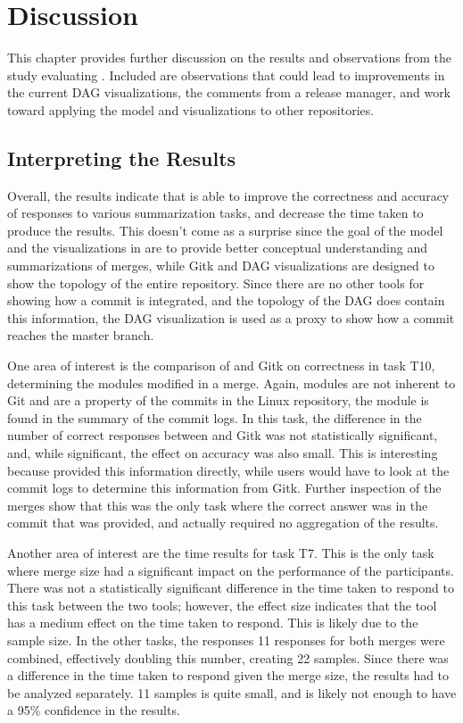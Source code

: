 \chapter{Discussion}\label{chap:discussion}

This chapter provides further discussion on the results and observations
from the study evaluating \tool{}. Included are observations that could
lead to improvements in the current DAG visualizations, the comments
from a release manager, and work toward applying the \mt{} model and
visualizations to other repositories.

\section{Interpreting the Results}\label{sec:interpreting_the_results}

Overall, the results indicate that \tool{} is able to improve the
correctness and accuracy of responses to various summarization tasks,
and decrease the time taken to produce the results. This doesn't come as
a surprise since the goal of the \mt{} model and the visualizations in
\tool{} are to provide better conceptual understanding and
summarizations of merges, while Gitk and DAG visualizations are designed
to show the topology of the entire repository. Since there are no other
tools for showing how a commit is integrated, and the topology of the
DAG does contain this information, the DAG visualization is used as a
proxy to show how a commit reaches the master branch.

One area of interest is the comparison of \tool{} and Gitk on
correctness in task T10, determining the modules modified in a merge.
Again, modules are not inherent to Git and are a property of the commits
in the Linux repository, the module is found in the summary of the
commit logs. In this task, the difference in the number of correct
responses between \tool{} and Gitk was not statistically significant,
and, while significant, the effect on accuracy was also small.
This is
interesting because \tool{} provided this information directly, while
users would have to look at the commit logs to determine this
information from Gitk.
Further inspection of the merges show that this
was the only task where the correct answer was in the commit that was
provided, and actually required no aggregation of the results.

Another area of interest are the time results for task T7. This is the
only task where merge size had a significant impact on the performance
of the participants. There was not a statistically significant
difference in the time taken to respond to this task between the two
tools; however, the effect size indicates that the tool has a medium
effect on the time taken to respond. This is likely due to the sample
size. In the other tasks, the responses 11 responses for both merges
were combined, effectively doubling this number, creating 22 samples.
Since there was a difference in the time taken to respond given the
merge size, the results had to be analyzed separately. 11 samples is
quite small, and is likely not enough to have a 95\% confidence in the
results.

